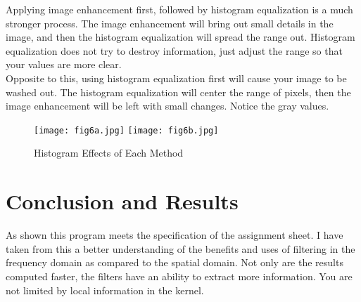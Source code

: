 \documentclass[10pt]{report}
\begin{document}
Applying image enhancement first, followed by histogram equalization is a much stronger
process. The image enhancement will bring out small details in the image, and then the 
histogram equalization will spread the range out. Histogram equalization does not try to 
destroy information, just adjust the range so that your values are more clear.\\ 

Opposite to this, using histogram equalization first will cause your image to be
washed out. The histogram equalization will center the range of pixels, then the image
enhancement will be left with small changes. Notice the gray values. 

\begin{figure}[!h]
\texttt{[image: fig6a.jpg]}
\texttt{[image: fig6b.jpg]}
\caption{Histogram Effects of Each Method}
\end{figure}

\clearpage
\section*{Conclusion and Results}
As shown this program meets the specification of the assignment sheet. I have taken from this a better understanding
of the benefits and uses of filtering in the frequency domain as compared to the spatial domain. Not only are
the results computed faster, the filters have an ability to extract more information. You are not limited by 
local information in the kernel. 
\end{document}
